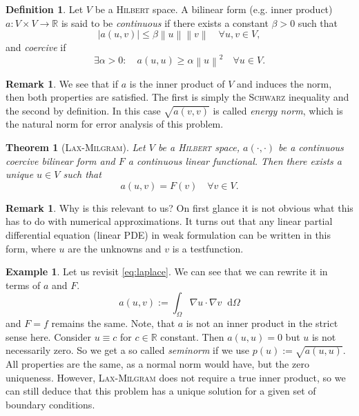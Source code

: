 \documentclass[12pt,a4paper,twoside, open=right]{scrreprt}
\theoremstyle{definition}
\newtheorem{rem}[auf]{Remark}
\newtheorem{defn}[auf]{Definition}
\newtheorem{bsp}[auf]{Example}
\theoremstyle{plain}
\newtheorem{sa}[auf]{Theorem}
\newcommand{\abs}[1]{\left\vert #1\right\vert}
\newcommand{\rr}{\mathbb{R}}
\newcommand{\norm}[1]{\left\lVert#1\right\rVert}
\newcommand{\D}{\mathop{}\!\mathrm{d}}
\begin{document}
\begin{defn}
    Let $V$ be a \textsc{Hilbert} space. A bilinear form (e.g. inner product) $a\colon V\times V\to\rr$ is said to be \emph{continuous} if there exists a constant $\beta>0$ such that
    \begin{equation}
        \abs{a(u,v)}\le\beta\norm{u}\norm{v}\quad \forall u,v\in V,
    \end{equation}
    and \emph{coercive} if 
    \begin{equation}
        \exists\alpha>0\colon \quad a(u,u)\ge \alpha\norm{u}^2\quad\forall u\in V.
    \end{equation}
\end{defn}
\begin{rem}
    We see that if $a$ is the inner product of $V$ and induces the norm, then both properties are satisfied. The first is simply the \textsc{Schwarz} inequality and the second by definition. In this case $\sqrt{a(v,v)}$ is called \emph{energy norm}, which is the natural norm for error analysis of this problem.
\end{rem}
\begin{sa}[\textsc{Lax-Milgram}]
    \label{sa:LaxMilgram}
    Let $V$ be a \textsc{Hilbert} space, $a(\cdot,\cdot)$ be a continuous coercive bilinear form and $F$ a continuous linear functional. Then there exists a unique $u\in V$ such that
    \begin{equation}
        a(u,v)=F(v)\quad \forall v\in V.
    \end{equation}
\end{sa}
\begin{rem}
    Why is this relevant to us? On first glance it is not obvious what this has to do with numerical approximations. It turns out that any linear partial differential equation (linear PDE) in weak formulation can be written in this form, where $u$ are the unknowns and $v$ is a testfunction.
\end{rem}
\begin{bsp}
    Let us revisit \eqref{eq:laplace}. We can see that we can rewrite it in terms of $a$ and $F$. 
    \begin{equation}
        a(u,v):=\int_\Omega \nabla u\cdot \nabla v\D\Omega
    \end{equation}
    and $F=f$ remains the same. Note, that $a$ is not an inner product in the strict sense here. Consider $u\equiv c$ for $c\in\rr$ constant. Then $a(u,u)=0$ but $u$ is not necessarily zero. So we get a so called \emph{seminorm} if we use $p(u):=\sqrt{a(u,u)}$. All properties are the same, as a normal norm would have, but the zero uniqueness. However, \textsc{Lax-Milgram} does not require a true inner product, so we can still deduce that this problem has a unique solution for a given set of boundary conditions.
\end{bsp}
\end{document}
